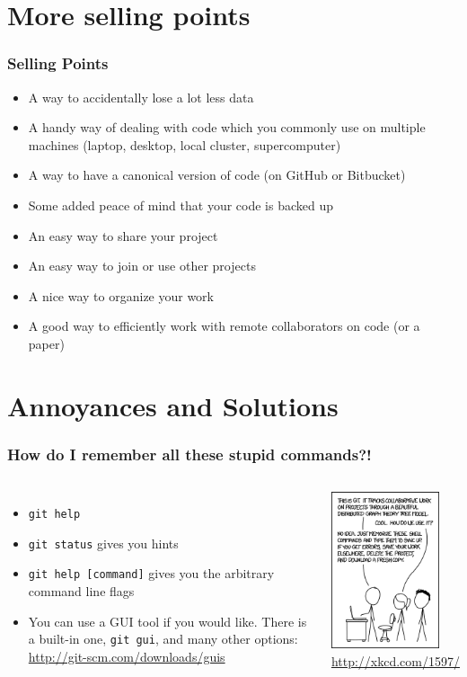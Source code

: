 \documentclass{beamer}
\begin{document}
\section{More selling points}
\begin{frame}[fragile]
\frametitle{Selling Points}
\begin{itemize}
\item A way to accidentally lose a lot less data
\item A handy way of dealing with code which you commonly use on multiple machines (laptop, desktop, local cluster, supercomputer)
\item A way to have a canonical version of code (on GitHub or Bitbucket)
\item Some added peace of mind that your code is backed up
\item An easy way to share your project
\item An easy way to join or use other projects
\item A nice way to organize your work
\item A good way to efficiently work with remote collaborators on code (or a paper)
\end{itemize}
\end{frame}

\section{Annoyances and Solutions}
\begin{frame}[fragile]
\frametitle{How do I remember all these stupid commands?!}
\begin{columns}
\begin{itemize}
\item \lstinline{git help}
\item \lstinline{git status} gives you hints
\item \lstinline{git help [command]} gives you the arbitrary command line flags
\item You can use a GUI tool if you would like. There is a built-in one, \lstinline{git gui}, and many other options:
\href{ https://git-scm.com/downloads/guis}{http://git-scm.com/downloads/guis}
\end{itemize}
\includegraphics[width=120px]{git.png}\\
{\tiny \href{http://xkcd.com/1597/}{http://xkcd.com/1597/}}
\end{columns}
\end{frame}
\end{document}
